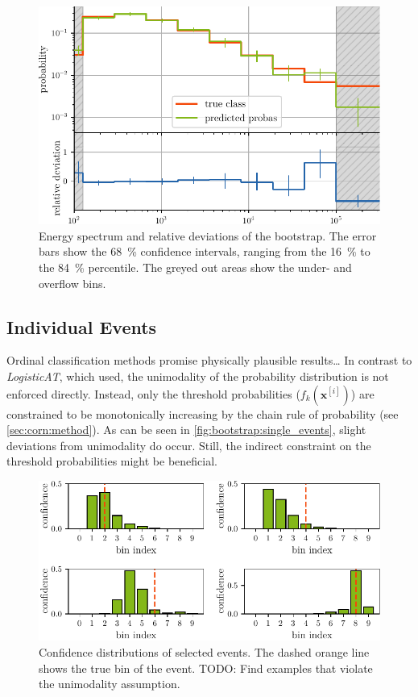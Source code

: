 
\begin{figure}
  \centering
  \includegraphics[scale=1]{content/plots/bootstrap:spectrum_full.pdf}
  \caption{
    Energy spectrum and relative deviations of the bootstrap.
    The error bars show the \SI{68}{\percent} confidence intervals,
    ranging from the \SI{16}{\percent} to the \SI{84}{\percent} percentile.
    The greyed out areas show the under- and overflow bins.
  }
  \label{fig:bootstrap:spectrum}
\end{figure}


\subsection{Individual Events}
Ordinal classification methods promise physically plausible results… %
In contrast to \emph{LogisticAT},
    which \citeauthor{dsea_jan} \cite{dsea_jan} used,
  the unimodality of the probability distribution is not enforced directly.
Instead,
  only the threshold probabilities ($f_k(\mathbf{x}^{[i]})$) are constrained to be monotonically increasing
  by the chain rule of probability
  (see \autoref{sec:corn:method}).
As can be seen in \autoref{fig:bootstrap:single_events},
  slight deviations from unimodality do occur.
Still,
  the indirect constraint on the threshold probabilities
  might be beneficial.

\begin{figure}
  \centering
  \includegraphics[scale=1]{content/plots/single_events_lessheight.pdf}
  \caption{
    Confidence distributions of selected events.
    The dashed orange line shows the true bin of the event.
    TODO: Find examples that violate the unimodality assumption.
  }
  \label{fig:bootstrap:single_events}
\end{figure}

